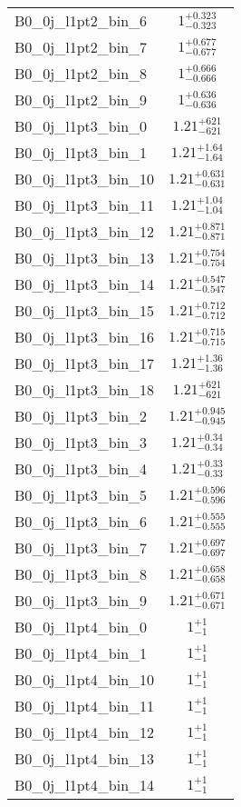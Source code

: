 \begin{tabular}{|l|c|}
B0\_0j\_l1pt2\_bin\_6 & $1^{+0.323}_{-0.323}$ \\
B0\_0j\_l1pt2\_bin\_7 & $1^{+0.677}_{-0.677}$ \\
B0\_0j\_l1pt2\_bin\_8 & $1^{+0.666}_{-0.666}$ \\
B0\_0j\_l1pt2\_bin\_9 & $1^{+0.636}_{-0.636}$ \\
B0\_0j\_l1pt3\_bin\_0 & $1.21^{+621}_{-621}$ \\
B0\_0j\_l1pt3\_bin\_1 & $1.21^{+1.64}_{-1.64}$ \\
B0\_0j\_l1pt3\_bin\_10 & $1.21^{+0.631}_{-0.631}$ \\
B0\_0j\_l1pt3\_bin\_11 & $1.21^{+1.04}_{-1.04}$ \\
B0\_0j\_l1pt3\_bin\_12 & $1.21^{+0.871}_{-0.871}$ \\
B0\_0j\_l1pt3\_bin\_13 & $1.21^{+0.754}_{-0.754}$ \\
B0\_0j\_l1pt3\_bin\_14 & $1.21^{+0.547}_{-0.547}$ \\
B0\_0j\_l1pt3\_bin\_15 & $1.21^{+0.712}_{-0.712}$ \\
B0\_0j\_l1pt3\_bin\_16 & $1.21^{+0.715}_{-0.715}$ \\
B0\_0j\_l1pt3\_bin\_17 & $1.21^{+1.36}_{-1.36}$ \\
B0\_0j\_l1pt3\_bin\_18 & $1.21^{+621}_{-621}$ \\
B0\_0j\_l1pt3\_bin\_2 & $1.21^{+0.945}_{-0.945}$ \\
B0\_0j\_l1pt3\_bin\_3 & $1.21^{+0.34}_{-0.34}$ \\
B0\_0j\_l1pt3\_bin\_4 & $1.21^{+0.33}_{-0.33}$ \\
B0\_0j\_l1pt3\_bin\_5 & $1.21^{+0.596}_{-0.596}$ \\
B0\_0j\_l1pt3\_bin\_6 & $1.21^{+0.555}_{-0.555}$ \\
B0\_0j\_l1pt3\_bin\_7 & $1.21^{+0.697}_{-0.697}$ \\
B0\_0j\_l1pt3\_bin\_8 & $1.21^{+0.658}_{-0.658}$ \\
B0\_0j\_l1pt3\_bin\_9 & $1.21^{+0.671}_{-0.671}$ \\
B0\_0j\_l1pt4\_bin\_0 & $1^{+1}_{-1}$ \\
B0\_0j\_l1pt4\_bin\_1 & $1^{+1}_{-1}$ \\
B0\_0j\_l1pt4\_bin\_10 & $1^{+1}_{-1}$ \\
B0\_0j\_l1pt4\_bin\_11 & $1^{+1}_{-1}$ \\
B0\_0j\_l1pt4\_bin\_12 & $1^{+1}_{-1}$ \\
B0\_0j\_l1pt4\_bin\_13 & $1^{+1}_{-1}$ \\
B0\_0j\_l1pt4\_bin\_14 & $1^{+1}_{-1}$ \\

\end{tabular}
